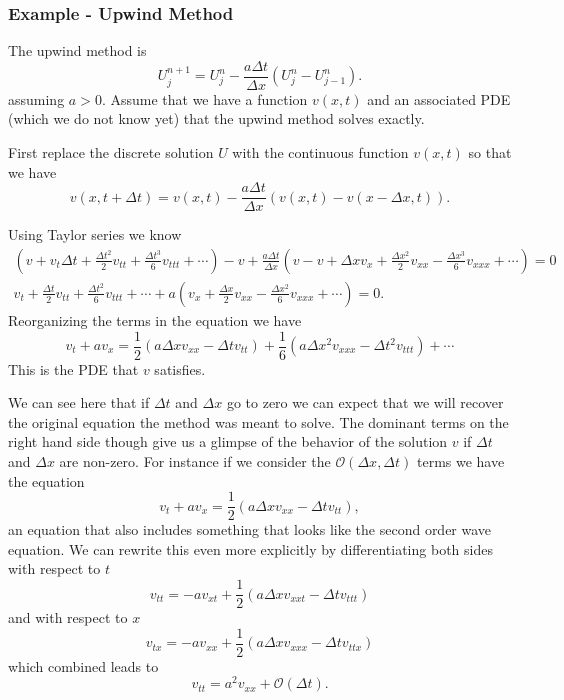 \documentclass[11pt]{article}
\begin{document}
    \hypertarget{example---upwind-method}{%
\subsubsection{Example - Upwind Method}\label{example---upwind-method}}

The upwind method is \[
    U^{n+1}_j = U^n_j - \frac{a \Delta t}{\Delta x} (U^n_j - U^n_{j-1}).
\] assuming \(a > 0\). Assume that we have a function \(v(x,t)\) and an
associated PDE (which we do not know yet) that the upwind method solves
exactly.

    First replace the discrete solution \(U\) with the continuous function
\(v(x,t)\) so that we have \[
    v(x, t + \Delta t) = v(x,t) - \frac{a \Delta t}{\Delta x} (v(x,t) - v(x-\Delta x,t)).
\]

    Using Taylor series we know \[\begin{aligned}
    \left(v + v_t \Delta t + \frac{\Delta t^2}{2} v_{tt} + \frac{\Delta t^3}{6} v_{ttt} + \cdots \right ) - v + \frac{a \Delta t}{\Delta x} \left( v - v + \Delta x v_x + \frac{\Delta x^2}{2} v_{xx} - \frac{\Delta x^3}{6} v_{xxx} + \cdots \right ) = 0\\    
    v_t + \frac{\Delta t}{2} v_{tt} + \frac{\Delta t^2}{6} v_{ttt} + \cdots + a \left( v_x + \frac{\Delta x}{2} v_{xx} - \frac{\Delta x^2}{6} v_{xxx} + \cdots \right ) = 0.
\end{aligned}\] Reorganizing the terms in the equation we have \[
    v_t + a v_x = \frac{1}{2}(a \Delta x v_{xx} - \Delta t v_{tt}) + \frac{1}{6} (a \Delta x^2 v_{xxx} - \Delta t^2 v_{ttt}) + \cdots
\] This is the PDE that \(v\) satisfies.

    We can see here that if \(\Delta t\) and \(\Delta x\) go to zero we can
expect that we will recover the original equation the method was meant
to solve. The dominant terms on the right hand side though give us a
glimpse of the behavior of the solution \(v\) if \(\Delta t\) and
\(\Delta x\) are non-zero. For instance if we consider the
\(\mathcal{O}(\Delta x, \Delta t)\) terms we have the equation \[
    v_t + a v_x = \frac{1}{2}(a \Delta x v_{xx} - \Delta t v_{tt}),
\] an equation that also includes something that looks like the second
order wave equation. We can rewrite this even more explicitly by
differentiating both sides with respect to \(t\) \[
    v_{tt} = -a v_{xt} + \frac{1}{2} (a \Delta x v_{xxt} - \Delta t v_{ttt})
\] and with respect to \(x\) \[
    v_{tx} = -a v_{xx} + \frac{1}{2} (a \Delta x v_{xxx} - \Delta t v_{ttx})
\] which combined leads to \[
    v_{tt} = a^2 v_{xx} + \mathcal{O}(\Delta t).
\]
\end{document}
